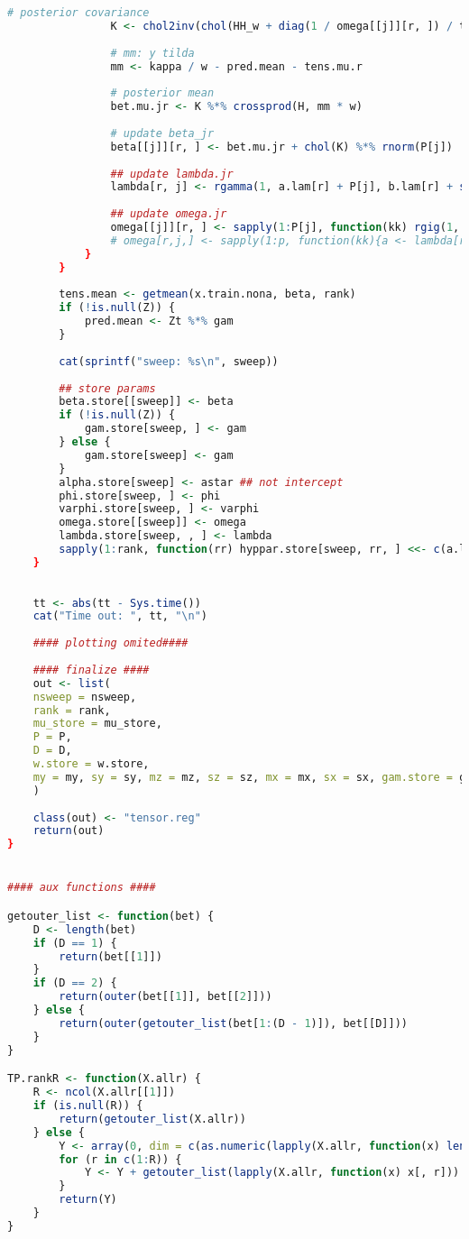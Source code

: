 \documentclass[AutoFakeBold]{LZUThesis}
\begin{document}
\begin{lstlisting}[language = R, caption = {BT-LR}算法]
				# posterior covariance
				K <- chol2inv(chol(HH_w + diag(1 / omega[[j]][r, ]) / tau.r[r]))
				
				# mm: y tilda
				mm <- kappa / w - pred.mean - tens.mu.r
				
				# posterior mean
				bet.mu.jr <- K %*% crossprod(H, mm * w)
				
				# update beta_jr
				beta[[j]][r, ] <- bet.mu.jr + chol(K) %*% rnorm(P[j])
				
				## update lambda.jr
				lambda[r, j] <- rgamma(1, a.lam[r] + P[j], b.lam[r] + sum(abs(beta[[j]][r, ])) / sqrt(tau.r[r]))
				
				## update omega.jr
				omega[[j]][r, ] <- sapply(1:P[j], function(kk) rgig(1, 1 / 2, beta[[j]][r, kk]^2 / tau.r[r], lambda[r, j]^2))
				# omega[r,j,] <- sapply(1:p, function(kk){a <- lambda[r,j]^2; b <- beta[[r]][kk,j]^2 / tau.r[r]; map <- besselK(sqrt(a*b),0.5 + 1) / besselK(sqrt(a*b), 0.5) * sqrt(b / a); return(map)})
			}
		}
		
		tens.mean <- getmean(x.train.nona, beta, rank)
		if (!is.null(Z)) {
			pred.mean <- Zt %*% gam
		}
		
		cat(sprintf("sweep: %s\n", sweep))
		
		## store params
		beta.store[[sweep]] <- beta
		if (!is.null(Z)) {
			gam.store[sweep, ] <- gam
		} else {
			gam.store[sweep] <- gam
		}
		alpha.store[sweep] <- astar ## not intercept
		phi.store[sweep, ] <- phi
		varphi.store[sweep, ] <- varphi
		omega.store[[sweep]] <- omega
		lambda.store[sweep, , ] <- lambda
		sapply(1:rank, function(rr) hyppar.store[sweep, rr, ] <<- c(a.lam[rr], b.lam[rr]))
	}
	
	
	tt <- abs(tt - Sys.time())
	cat("Time out: ", tt, "\n")
	
	#### plotting omited####
	
	#### finalize ####
	out <- list(
	nsweep = nsweep,
	rank = rank,
	mu_store = mu_store,
	P = P,
	D = D,
	w.store = w.store,
	my = my, sy = sy, mz = mz, sz = sz, mx = mx, sx = sx, gam.store = gam.store, beta.store = beta.store, time = tt
	)
	
	class(out) <- "tensor.reg"
	return(out)
}


#### aux functions ####

getouter_list <- function(bet) {
	D <- length(bet)
	if (D == 1) {
		return(bet[[1]])
	}
	if (D == 2) {
		return(outer(bet[[1]], bet[[2]]))
	} else {
		return(outer(getouter_list(bet[1:(D - 1)]), bet[[D]]))
	}
}

TP.rankR <- function(X.allr) {
	R <- ncol(X.allr[[1]])
	if (is.null(R)) {
		return(getouter_list(X.allr))
	} else {
		Y <- array(0, dim = c(as.numeric(lapply(X.allr, function(x) length(x[, 1])))))
		for (r in c(1:R)) {
			Y <- Y + getouter_list(lapply(X.allr, function(x) x[, r]))
		}
		return(Y)
	}
}


\end{lstlisting}
\end{document}
